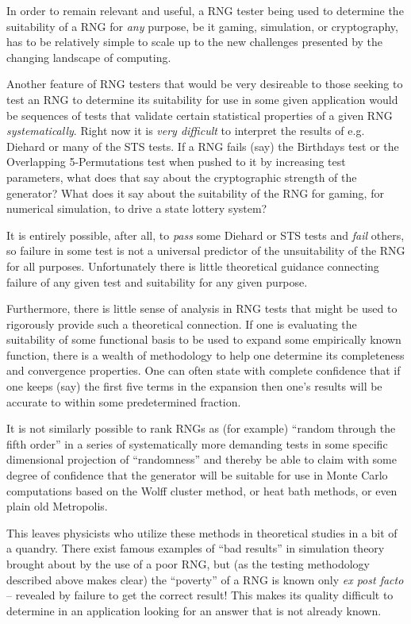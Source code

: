\documentclass[12pt]{article}
\begin{document}
In order to remain relevant and useful, a RNG tester being used to
determine the suitability of a RNG for {\em any} purpose, be it gaming,
simulation, or cryptography, has to be relatively simple to scale up to
the new challenges presented by the changing landscape of computing.

Another feature of RNG testers that would be very desireable to those
seeking to test an RNG to determine its suitability for use in some
given application would be sequences of tests that validate certain
statistical properties of a given RNG {\em systematically}.  Right now
it is {\em very difficult} to interpret the results of e.g. Diehard or
many of the STS tests.  If a RNG fails (say) the Birthdays test or the
Overlapping 5-Permutations test when pushed to it by increasing test
parameters, what does that say about the cryptographic strength of the
generator?  What does it say about the suitability of the RNG for
gaming, for numerical simulation, to drive a state lottery system?

It is entirely possible, after all, to {\em pass} some Diehard or STS
tests and {\em fail} others, so failure in some test is not a universal
predictor of the unsuitability of the RNG for all purposes.
Unfortunately there is little theoretical guidance connecting failure of
any given test and suitability for any given purpose.  

Furthermore, there is little sense of analysis in RNG tests that might
be used to rigorously provide such a theoretical connection.  If one is
evaluating the suitability of some functional basis to be used to expand
some empirically known function, there is a wealth of methodology to
help one determine its completeness and convergence properties.  One can
often state with complete confidence that if one keeps (say) the first
five terms in the expansion then one's results will be accurate to
within some predetermined fraction.  

It is not similarly possible to rank RNGs as (for example) ``random
through the fifth order'' in a series of systematically more demanding
tests in some specific dimensional projection of ``randomness'' and
thereby be able to claim with some degree of confidence that the
generator will be suitable for use in Monte Carlo computations based on
the Wolff cluster method\cite{Wolff}, or heat bath
methods\cite{BinderHeerman}, or even plain old
Metropolis\cite{Metropolis}.  

This leaves physicists who utilize these methods in theoretical studies
in a bit of a quandry.  There exist famous examples of ``bad results''
in simulation theory brought about by the use of a poor RNG, but (as the
testing methodology described above makes clear) the ``poverty'' of a
RNG is known only {\em ex post facto} -- revealed by failure to get the
correct result!  This makes its quality difficult to determine in an
application looking for an answer that is not already known.
\end{document}
